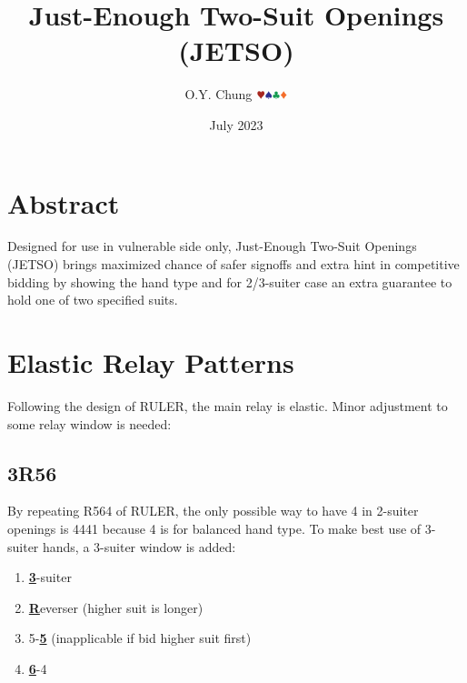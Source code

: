 \documentclass{article}
\title{Just-Enough Two-Suit Openings (JETSO)}
\author{O.Y. Chung $\hhh\sss\ccc\ddd$}
\date{July 2023}
\begin{document}
\begin{CJK*}{UTF8}{gbsn}
\end{CJK*}
\maketitle

\begin{multicols}{2}

\section{Abstract}
Designed for use in vulnerable side only, Just-Enough Two-Suit Openings (JETSO) brings maximized chance of safer signoffs and extra hint in competitive bidding by showing the hand type and for 2/3-suiter case an extra guarantee to hold one of two specified suits.

\section{Elastic Relay Patterns}
Following the design of RULER, the main relay is elastic. Minor adjustment to some relay window is needed:
\subsection{3R56}
By repeating R564 of RULER, the only possible way to have 4 in 2-suiter openings is 4441 because 4 is for balanced hand type. To make best use of 3-suiter hands, a 3-suiter window is added:
\begin{enumerate}
    \item \textbf{\underline{3}}-suiter
    \item \textbf{\underline{R}}everser (higher suit is longer)
    \item 5-\textbf{\underline{5}} (inapplicable if bid higher suit first)
    \item \textbf{\underline{6}}-4
\end{enumerate}


\end{multicols}
\end{document}
